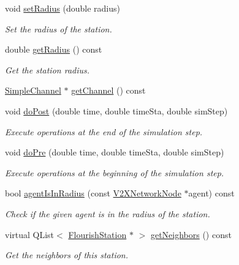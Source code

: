 \begin{DoxyCompactItemize}
\item 
void \hyperlink{classFlourishStation_a17ba50ba20d55d98ac51e599e35540f4}{set\+Radius} (double radius)
\begin{DoxyCompactList}\small\item\em Set the radius of the station. \end{DoxyCompactList}\item 
double \hyperlink{classFlourishStation_a5053348c641ca1b71133f20d27481bd7}{get\+Radius} () const 
\begin{DoxyCompactList}\small\item\em Get the station radius. \end{DoxyCompactList}\item 
\hyperlink{classSimpleChannel}{Simple\+Channel} $\ast$ \hyperlink{classFlourishStation_a1b3dd54c5ea74e919b9d5cc7d92b757d}{get\+Channel} () const 
\item 
void \hyperlink{classFlourishStation_a0093cc9442a3ff16f064c402ba479084}{do\+Post} (double time, double time\+Sta, double sim\+Step)
\begin{DoxyCompactList}\small\item\em Execute operations at the end of the simulation step. \end{DoxyCompactList}\item 
void \hyperlink{classFlourishStation_abc038feac73ec5835c194648fe319bc6}{do\+Pre} (double time, double time\+Sta, double sim\+Step)
\begin{DoxyCompactList}\small\item\em Execute operations at the beginning of the simulation step. \end{DoxyCompactList}\item 
bool \hyperlink{classFlourishStation_a80a772ef1fb87d5e3d604ca8c9f3c54d}{agent\+Is\+In\+Radius} (const \hyperlink{classV2XNetworkNode}{V2\+X\+Network\+Node} $\ast$agent) const 
\begin{DoxyCompactList}\small\item\em Check if the given agent is in the radius of the station. \end{DoxyCompactList}\item 
virtual Q\+List$<$ \hyperlink{classFlourishStation}{Flourish\+Station} $\ast$ $>$ \hyperlink{classFlourishStation_a1fe311546a3336d1090829900a21f279}{get\+Neighbors} () const 
\begin{DoxyCompactList}\small\item\em Get the neighbors of this station. \end{DoxyCompactList}\end{DoxyCompactItemize}
